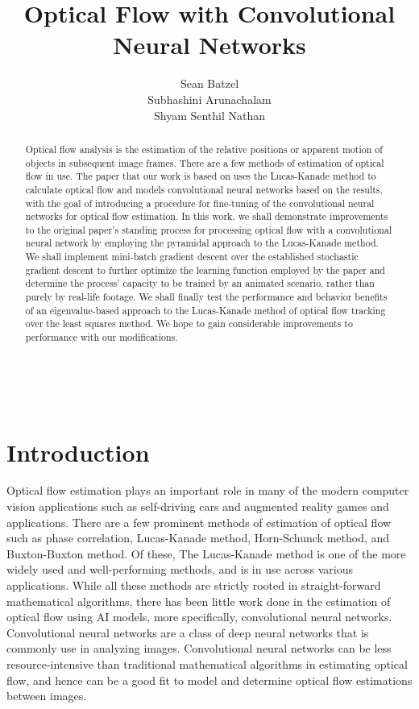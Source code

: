 \documentclass[]{article}
\title{Optical Flow with Convolutional Neural Networks}
\author{Sean Batzel\\Subhashini Arunachalam\\Shyam Senthil Nathan}
\begin{document}
    \maketitle~\nocite{*}

    \begin{abstract}
        Optical flow analysis is the estimation of the relative positions or apparent motion of objects in subsequent image frames.
        There are a few methods of estimation of optical flow in use.
        The paper that our work is based on uses the Lucas-Kanade method to calculate optical flow and models convolutional neural networks based on the results, with the goal of introducing a procedure for fine-tuning of the convolutional neural networks for optical flow estimation.
        In this work, we shall demonstrate improvements to the original paper’s standing process for processing optical flow with a convolutional neural network by employing the pyramidal approach to the Lucas-Kanade method.
        We shall implement mini-batch gradient descent over the established stochastic gradient descent to further optimize the learning function employed by the paper and determine the process’ capacity to be trained by an animated scenario, rather than purely by real-life footage.
        We shall finally test the performance and behavior benefits of an eigenvalue-based approach to the Lucas-Kanade method of optical flow tracking over the least squares method.
        We hope to gain considerable improvements to performance with our modifications.
    \end{abstract}


    \section{Introduction}\label{sec:introduction}
    Optical flow estimation plays an important role in many of the modern computer vision applications such as self-driving cars and augmented reality games and applications.
    There are a few prominent methods of estimation of optical flow such as phase correlation, Lucas-Kanade method, Horn-Schunck method, and Buxton-Buxton method.
    Of these, The Lucas-Kanade method is one of the more widely used and well-performing methods, and is in use across various applications.
    While all these methods are strictly rooted in straight-forward mathematical algorithms, there has been little work done in the estimation of optical flow using AI models, more specifically, convolutional neural networks.
    Convolutional neural networks are a class of deep neural networks that is commonly use in analyzing images.
    Convolutional neural networks can be less resource-intensive than traditional mathematical algorithms in estimating optical flow, and hence can be a good fit to model and determine optical flow estimations between images.
\end{document}
